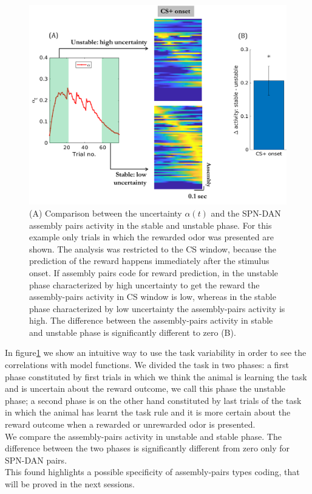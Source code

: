 \begin{figure}
    \centering
    \includegraphics[scale=0.55]{figures/PreRegress.png}
    \caption{(A) Comparison between the uncertainty $\alpha(t)$ and the SPN-DAN assembly pairs activity in the stable and unstable phase. For this example only trials in which the rewarded odor was presented are shown. The analysis was restricted to the CS window, because the prediction of the reward happens immediately after the stimulus onset. If assembly pairs code for reward prediction, in the unstable phase characterized by high uncertainty to get the reward the assembly-pairs activity in CS window is low, whereas in the stable phase characterized by low uncertainty the assembly-pairs activity is high. The difference between the assembly-pairs activity in stable and unstable phase is significantly different to zero (B).}
    \label{fig:StableUnstableAlphaCS}
\end{figure}
In figure\ref{fig:StableUnstableAlphaCS} we show an intuitive way to use the task variability in order to see the correlations with model functions. We divided the task in two phases: a first phase constituted by first trials in which we think the animal is learning the task and is uncertain about the reward outcome, we call this phase the unstable phase; a second phase is on the other hand constituted by last trials of the task in which the animal has learnt the task rule and it is more certain about the reward outcome when a rewarded or unrewarded odor is presented.\\We compare the assembly-pairs activity in unstable and stable phase. The difference between the two phases is significantly different from zero only for SPN-DAN pairs.\\This found highlights a possible specificity of assembly-pairs types coding, that will be proved in the next sessions.\\
